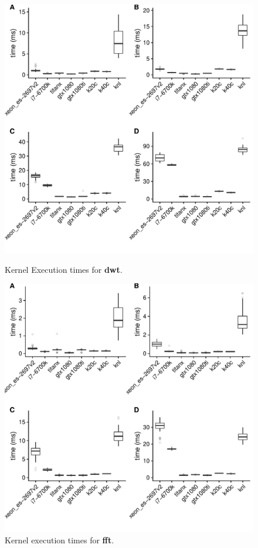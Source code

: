 \documentclass[../document.tex]{subfiles}
\begin{document}
\begin{figure}
\begin{minipage}[b]{.45\textwidth}
\centering
\includegraphics[width=1\textwidth]{figures/time-results/dwt.pdf}
\caption{Kernel Execution times for {\bf dwt}.}
\label{fig:time-dwt}
\end{minipage}
\hfill
\begin{minipage}[b]{.45\textwidth}
\centering
\includegraphics[width=1\textwidth]{figures/time-results/fft.pdf}
\caption{Kernel execution times for {\bf fft}.}
\label{fig:time-fft}
\end{minipage}
\end{figure}
\end{document}
